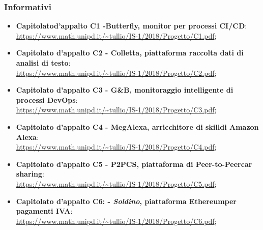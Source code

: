 \subsubsection{Informativi}
\begin{itemize}
	\item \textbf{Capitolato\glosp d'appalto C1 -Butterfly, monitor per processi CI/CD}: \\ \url{https://www.math.unipd.it/~tullio/IS-1/2018/Progetto/C1.pdf};
	
	\item \textbf{Capitolato d'appalto C2 - Colletta, piattaforma raccolta dati di analisi di testo}:\\
	\url{https://www.math.unipd.it/~tullio/IS-1/2018/Progetto/C2.pdf};
	
	\item \textbf{Capitolato d'appalto C3 - G\&B, monitoraggio intelligente di processi DevOps\glo}:\\
	\url{https://www.math.unipd.it/~tullio/IS-1/2018/Progetto/C3.pdf};
	
	\item \textbf{Capitolato d'appalto C4 - MegAlexa, arricchitore di skill\glosp di Amazon Alexa}:\\
	\url{https://www.math.unipd.it/~tullio/IS-1/2018/Progetto/C4.pdf};
	
	\item \textbf{Capitolato d'appalto C5 - P2PCS, piattaforma di Peer-to-Peer\glosp car sharing}:\\
	\url{https://www.math.unipd.it/~tullio/IS-1/2018/Progetto/C5.pdf};
	
	\item \textbf{Capitolato d'appalto C6: - \textit{Soldino}, piattaforma Ethereum\glosp per pagamenti IVA}:\\
	\url{https://www.math.unipd.it/~tullio/IS-1/2018/Progetto/C6.pdf};
\end{itemize}

	
	

